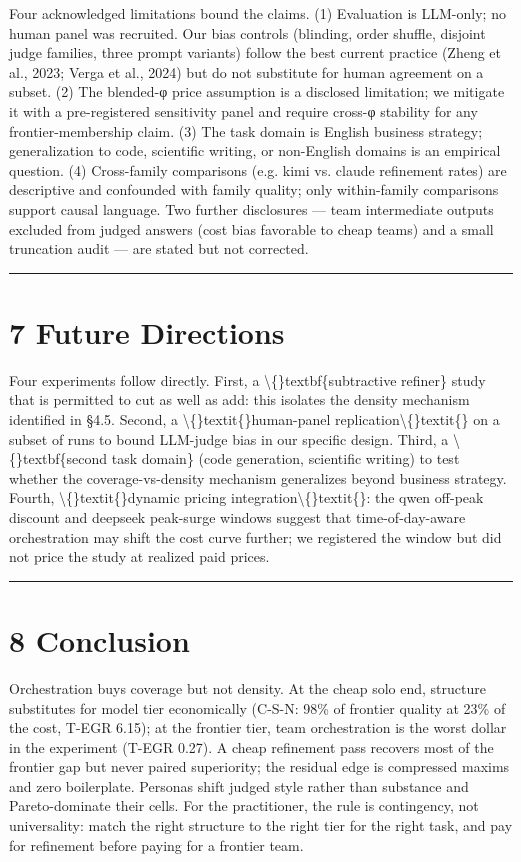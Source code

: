 \documentclass[11pt,a4paper]{article}
\begin{document}
Four acknowledged limitations bound the claims. (1) Evaluation is
LLM-only; no human panel was recruited. Our bias controls (blinding,
order shuffle, disjoint judge families, three prompt variants) follow
the best current practice (Zheng et al., 2023; Verga et al., 2024)
but do not substitute for human agreement on a subset. (2) The
blended-φ price assumption is a disclosed limitation; we mitigate it
with a pre-registered sensitivity panel and require cross-φ stability
for any frontier-membership claim. (3) The task domain is English
business strategy; generalization to code, scientific writing, or
non-English domains is an empirical question. (4) Cross-family
comparisons (e.g. kimi vs. claude refinement rates) are descriptive
and confounded with family quality; only within-family comparisons
support causal language. Two further disclosures — team intermediate
outputs excluded from judged answers (cost bias favorable to cheap
teams) and a small truncation audit — are stated but not corrected.

\hrule


\section{7 Future Directions}

Four experiments follow directly. First, a \textbackslash\{\}textbf\{subtractive refiner\}
study that is permitted to cut as well as add: this isolates the
density mechanism identified in §4.5. Second, a \textbackslash\{\}textit\{\}human-panel
replication\textbackslash\{\}textit\{\} on a subset of runs to bound LLM-judge bias in our
specific design. Third, a \textbackslash\{\}textbf\{second task domain\} (code generation,
scientific writing) to test whether the coverage-vs-density
mechanism generalizes beyond business strategy. Fourth, \textbackslash\{\}textit\{\}dynamic
pricing integration\textbackslash\{\}textit\{\}: the qwen off-peak discount and deepseek
peak-surge windows suggest that time-of-day-aware orchestration may
shift the cost curve further; we registered the window but did not
price the study at realized paid prices.

\hrule


\section{8 Conclusion}

Orchestration buys coverage but not density. At the cheap solo end,
structure substitutes for model tier economically (C-S-N: 98\% of
frontier quality at 23\% of the cost, T-EGR 6.15); at the frontier
tier, team orchestration is the worst dollar in the experiment
(T-EGR 0.27). A cheap refinement pass recovers most of the frontier
gap but never paired superiority; the residual edge is compressed
maxims and zero boilerplate. Personas shift judged style rather than
substance and Pareto-dominate their cells. For the practitioner, the
rule is contingency, not universality: match the right structure to
the right tier for the right task, and pay for refinement before
paying for a frontier team.
\end{document}

